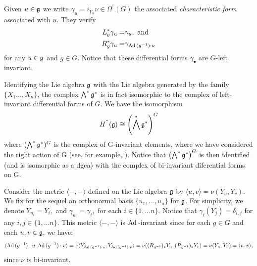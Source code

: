 \documentclass[a4paper,oneside,10pt,reqno]{amsart}
\theoremstyle{definition}
\newcommand\negro{\normalcolor}
\newcommand{\g}{\noindent {\mathfrak{g}}}
\newcommand{\Ad}{\mathop{\rm Ad \, } \nolimits}
\newcommand\Om{\Omega}
\newcommand{\coho}[3]{{#1}^{^{#2}}{\left( #3 \right)}}
\begin{document}
Given $u\in \g$ we write $\gamma_u =  i_{Y_u} \nu \in  \coho \Om 1 G$ the associated \emph{characteristic form} associated with $u$.
They verify 
\begin{align}\label{Rdelta}
L_g^*\gamma_u =& \gamma_u, \hbox{ and }\\ \nonumber
R_g^*\gamma_u =& \gamma_{\Ad(g^{-1})\cdot u}
\end{align}
for any $u\in \g$ and $ g\in G$.
 Notice that these differential forms $\gamma_\bullet$  are $G$-left invariant.


  Identifying the Lie algebra $\g$ with  the Lie algebra generated by the family $\{ X_1 \ldots ,X_n\}$, the complex  $ \bigwedge^* \g^*$ is in fact isomorphic to the complex of left-invariant differential forms of $G$. 
We have the isomorphism
\begin{equation}\label{gg}
 \coho H * {\g} \cong \left( \bigwedge^* \g^*\right)^G
\end{equation}
where $( \bigwedge^* \g^*)^G$  is the complex of G-invariant elements,
where we have considered the right action of G (see, for example, \cite[Chap. 4, Sec.2]{MR0336651} ). Notice that
$\left( \bigwedge^* \g^*\right)^G$ is then identified (and is isomorphic as a dgca)
 with the complex of bi-invariant diferential forms on G.

\negro
\smallskip



Consider the metric $\langle -,-\rangle$ defined on the Lie algebra $\g$ by $ \langle u,v\rangle =\nu (Y_u,Y_v)$. 
We fix for the sequel an orthonormal basis $\{u_1, \ldots, u_n\}$ for  $\g$.  For simplicity, we denote
$
Y_{u_i} = Y_i,
$
and 
 $
 \gamma_{u_i} = \gamma_i,
 $
for each $i\in \{1, \ldots n\}$. Notice that $\gamma_i (Y_j)= \delta_{i,j}$ for any $i,j \in \{1, \ldots n\}$.
 This metric $\langle -,-\rangle$ is $\Ad$-invariant since for each $g\in G$ and each $u,v\in \g$, we have:
\begin{align}\label{InvAd}
\langle \Ad(g^{-1}) \cdot u, \Ad(g^{-1})\cdot v\rangle = \nu (Y_{\Ad(g^{-1}) \cdot u}, Y_{\Ad(g^{-1})\cdot v}\rangle 
   =
 \nu ((R_{g^{-1}})_*Y_{ u}, (R_{g^{-1}})_* Y_{ v}\rangle
  = \nu( Y_{ u},Y_{ v} )  =  \langle { u},{ v} \rangle ,
\end{align}
since $\nu$ is bi-invariant.
\end{document}
